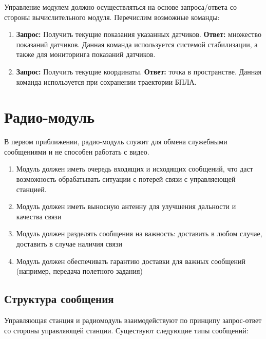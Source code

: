 \documentclass[utf8]{report}
\begin{document}
Управление модулем должно осуществляться на основе запроса/ответа со стороны вычислительного модуля. Перечислим возможные команды:

\begin{enumerate}
  \item \textbf{Запрос:} Получить текущие показания указанных датчиков. \textbf{Ответ:} множество показаний датчиков. Данная команда используется системой стабилизации, а также для мониторинга показаний датчиков.
  \item \textbf{Запрос:} Получить текущие координаты. \textbf{Ответ:} точка в пространстве. Данная команда используется при сохранении траектории БПЛА.
\end{enumerate}

\section{Радио-модуль}

В первом приближении, радио-модуль служит для обмена служебными сообщениями и не способен работать с видео.

\begin{enumerate}
  \item Модуль должен иметь очередь входящих и исходящих сообщений, что даст возможность обрабатывать ситуации с потерей связи с управляеющей станцией.
  \item Модуль должен иметь выносную антенну для улучшения дальности и качества связи
  \item Модуль должен разделять сообщения на важность: доставить в любом случае, доставить в случае наличия связи
  \item Модуль должен обеспечивать гарантию доставки для важных сообщений (например, передача полетного задания)
\end{enumerate}

\subsection{Структура сообщения}

Управляющая станция и радиомодуль взаимодействуют по принципу запрос-ответ со стороны управляющей станции. Существуют следующие типы сообщений:
\end{document}
